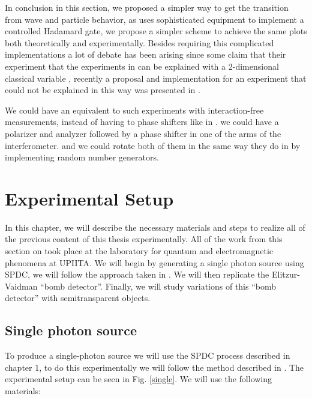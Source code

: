 \documentclass{book}
\begin{document}
In conclusion in this section, we proposed a simpler way to get the transition from wave and particle behavior, as \cite{Kaiser2012,Peruzzo} uses sophisticated equipment to implement a controlled Hadamard gate, we propose a simpler scheme to achieve the same plots both theoretically and experimentally. Besides requiring this complicated implementations a lot of debate has been arising since some claim that their experiment that the experiments in \cite{Kaiser2012,Peruzzo}  can be explained with a 2-dimensional classical variable \cite{Rossi,Chaves}, recently a proposal and implementation for an experiment that could not be explained in this way was presented in \cite{Polino}.

We could have an equivalent to such experiments with interaction-free measurements, instead of having to phase shifters like in \cite{Polino}. we could have a polarizer and analyzer followed by a phase shifter in one of the arms of the interferometer. and we could rotate both of them in the same way they do in \cite{Polino} by implementing random number generators.



\pagebreak







\pagebreak
\chapter{Experimental Setup}
In this chapter, we will describe the necessary materials and steps to realize all of the previous content of this thesis experimentally. All of the work from this section on took place at the laboratory for quantum and electromagnetic phenomena at UPIITA. We will begin by generating a single photon source using SPDC, we will follow the approach taken in \cite{maestria_procopio}. We will then replicate the Elitzur-Vaidman ``bomb detector''. Finally, we will study variations of this ``bomb detector'' with semitransparent objects.

\section{Single photon source}

To produce a single-photon source we will use the SPDC process described in chapter 1, to do this experimentally we will follow the method described in \cite{maestria_procopio}. The experimental setup can be seen in Fig. \ref{single}.  We will use the following materials:
\end{document}
